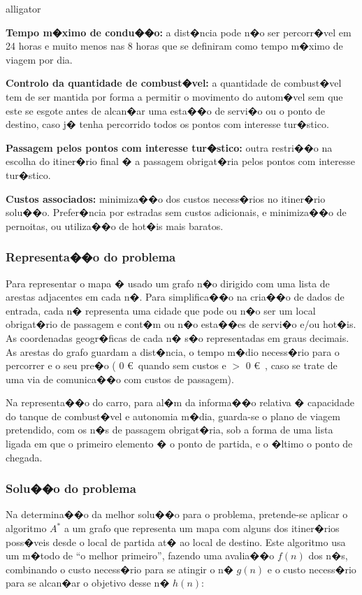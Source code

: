 \documentclass[a4paper,11pt]{article}
\begin{document}
\begin{labeling}{alligator}
\item [\textbf{Tempo m�ximo de condu��o:}] a dist�ncia pode n�o ser percorr�vel em 24 horas e muito menos nas 8 horas que se definiram como tempo m�ximo de viagem por dia.
\item [\textbf{Controlo da quantidade de combust�vel:}] a quantidade de combust�vel tem de ser mantida por forma a permitir o movimento do autom�vel sem que este se esgote antes de alcan�ar uma esta��o de servi�o ou o ponto de destino, caso j� tenha percorrido todos os pontos com interesse tur�stico.
\item [\textbf{Passagem pelos pontos com interesse tur�stico:}] outra restri��o na escolha do itiner�rio final � a passagem obrigat�ria pelos pontos com interesse tur�stico.
\item [\textbf{Custos associados:}] minimiza��o dos custos necess�rios no itiner�rio solu��o. Prefer�ncia por estradas sem custos adicionais, e minimiza��o de pernoitas, ou utiliza��o de hot�is mais baratos.
\end{labeling}

\subsubsection{Representa��o do problema}
Para representar o mapa � usado um grafo n�o dirigido com uma lista de arestas adjacentes em cada n�. Para simplifica��o na cria��o de dados de entrada, cada n� representa uma cidade que pode ou n�o ser um local obrigat�rio de passagem e cont�m ou n�o esta��es de servi�o e/ou hot�is. As coordenadas geogr�ficas de cada n� s�o representadas em graus decimais. As arestas do grafo guardam a dist�ncia, o tempo m�dio necess�rio para o percorrer e o seu pre�o ( 0 \euro \ quando sem custos e $>$ 0 \euro \ , caso se trate de uma via de comunica��o com custos de passagem).

Na representa��o do carro, para al�m da informa��o relativa � capacidade do tanque de combust�vel e autonomia m�dia, guarda-se o plano de viagem pretendido, com os n�s de passagem obrigat�ria, sob a forma de uma lista ligada em que o primeiro elemento � o ponto de partida, e o �ltimo o ponto de chegada.

\subsubsection{Solu��o do problema}
Na determina��o da melhor solu��o para o problema, pretende-se aplicar o algoritmo $A^*$ a um grafo que representa um mapa com alguns dos itiner�rios poss�veis desde o local de partida at� ao local de destino. Este algoritmo usa um m�todo de ``o melhor primeiro'', fazendo uma avalia��o $f(n)$ dos n�s, combinando o custo necess�rio para se atingir o n� $g(n)$ e o custo necess�rio para se alcan�ar o objetivo desse n� $h(n)$:
\end{document}
